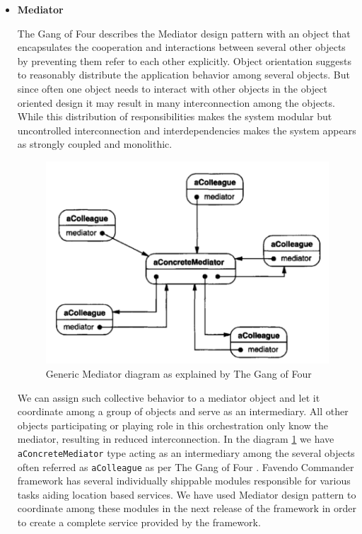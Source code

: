 \begin{itemize}
	\item \textbf{Mediator}
	\par The Gang of Four \cite{gamma1995design} describes the Mediator design pattern with an object that encapsulates the cooperation and interactions between several other objects by preventing them refer to each other explicitly. Object orientation suggests to reasonably distribute the application behavior among several objects. But since often one object needs to interact with other objects in the object oriented design it may result in many interconnection among the objects. While this distribution of responsibilities makes the system modular but uncontrolled interconnection and interdependencies makes the system appears as strongly coupled and monolithic.
	\begin{figure}[H]
		\centering
		\includegraphics[scale = 0.5]{images/mediator}
		\caption{Generic Mediator diagram as explained by The Gang of Four  \cite{gamma1995design}}
		\label{figure:design_pattern_mediator}
	\end{figure}
	\par We can assign such collective behavior to a mediator object and let it coordinate among a group of objects and serve as an intermediary. All other objects participating or playing role in this orchestration only know the mediator, resulting in reduced interconnection. In the diagram \ref{figure:design_pattern_mediator} we have  \texttt{aConcreteMediator} type acting as an intermediary among the several objects often referred as \texttt{aColleague} as per The Gang of Four \cite{gamma1995design}. Favendo Commander framework has several individually shippable modules responsible for various tasks aiding location based services. We have used Mediator design pattern to coordinate among these modules in the next release of the framework in order to create a complete service provided by the framework.

\end{itemize}
